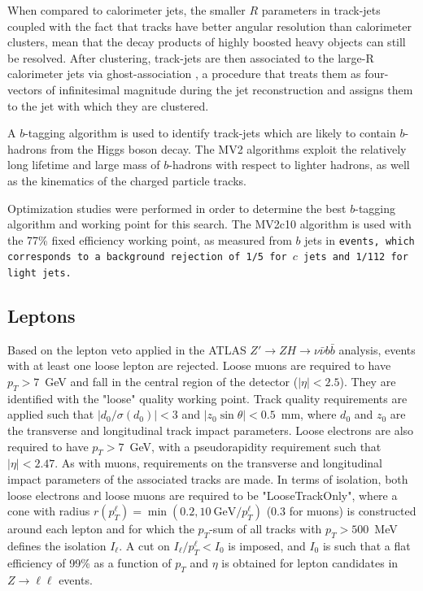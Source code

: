 When compared to calorimeter jets, the smaller $R$ parameters in track-jets coupled with the fact that tracks have better angular resolution than calorimeter clusters, mean that the decay products of highly boosted heavy objects can still be resolved.
After clustering, track-jets are then associated to the large-R calorimeter jets via ghost-association \cite{Cacciari:2008gn}, a procedure that treats them as four-vectors of infinitesimal magnitude during the jet reconstruction and assigns them to the jet with which they are clustered.

A $b$-tagging algorithm is used to identify track-jets which are likely to contain $b$-hadrons from the Higgs boson decay. The MV2 algorithms exploit the relatively long lifetime and large mass of $b$-hadrons with respect to lighter hadrons, as well as the kinematics of the charged particle tracks.

Optimization studies were performed in order to determine the best $b$-tagging algorithm and working point for this search.
The MV2c10 algorithm is used with the 77\% fixed efficiency working point, as measured from $b$ jets in \tt events, which corresponds to a background rejection of 1/5 for $c$ jets and 1/112 for light jets.

\subsection{Leptons}
\label{sec:leptons}
Based on the lepton veto applied in the ATLAS $Z' \rightarrow ZH\rightarrow \nu\bar{\nu} b\bar{b}$ analysis, events with at least one loose lepton are rejected.
Loose muons are required to have $p_{T}>7$~GeV and fall in the central region of the detector ($|\eta|<2.5$). They are identified with the "loose" quality working point. Track quality requirements are applied such that $|d_{0}/\sigma(d_{0})|<3$ and $|z_{0}\sin\theta|<0.5$~mm, where $d_{0}$ and $z_{0}$ are the transverse and longitudinal track impact parameters. Loose electrons are also required to have $p_{T}>7$~GeV, with a pseudorapidity requirement such that $|\eta|<2.47$. As with muons, requirements on the transverse and longitudinal impact parameters of the associated tracks are made. In terms of isolation, both loose electrons and loose muons are required to be "LooseTrackOnly", where a cone with radius $r(p_{T}^{\ell})=\min(0.2,10~\text{GeV}/p_{T}^{\ell})$ (0.3 for muons) is constructed around each lepton and for which the $p_{T}$-sum of all tracks with $p_{T}>500$~MeV defines the isolation $I_\ell$. A cut on $I_\ell/p_{T}^{\ell}<I_{0}$ is imposed, and $I_{0}$ is such that a flat efficiency of 99\% as a function of $p_{T}$ and $\eta$ is obtained for lepton candidates in $Z\rightarrow \ell \ell$ events.

